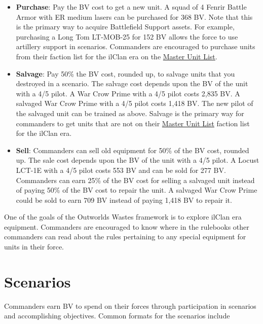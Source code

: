 \documentclass[UTF8]{article}
\begin{document}
\begin{itemize}
\item {\bf Purchase}: Pay the BV cost to get a new unit.
A squad of 4 Fenrir Battle Armor with ER medium lasers can be purchased for 368 BV.
Note that this is the primary way to acquire Battlefield Support assets.
For example, purchasing a Long Tom LT-MOB-25 for 152 BV allows the force to use artillery support in scenarios.
Commanders are encouraged to purchase units from their faction list for the ilClan era on the \href{http://www.masterunitlist.info/}{Master Unit List}.

\item {\bf Salvage}: Pay 50\% the BV cost, rounded up, to salvage units that you destroyed in a scenario.
The salvage cost depends upon the BV of the unit with a 4/5 pilot.
A War Crow Prime with a 4/5 pilot costs 2,835 BV.
A salvaged War Crow Prime with a 4/5 pilot costs 1,418 BV.
The new pilot of the salvaged unit can be trained as above.
Salvage is the primary way for commanders to get units that are not on their \href{http://www.masterunitlist.info/}{Master Unit List} faction list for the ilClan era.

\item {\bf Sell}: Commanders can sell old equipment for 50\% of the BV cost, rounded up.
The sale cost depends upon the BV of the unit with a 4/5 pilot.
A Locust LCT-1E with a 4/5 pilot costs 553 BV and can be sold for 277 BV.
Commanders can earn 25\% of the BV cost for selling a salvaged unit instead of paying 50\% of the BV cost to repair the unit.
A salvaged War Crow Prime could be sold to earn 709 BV instead of paying 1,418 BV to repair it.

\end{itemize}

One of the goals of the Outworlds Wastes framework is to explore ilClan era equipment.
Commanders are encouraged to know where in the rulebooks other commanders can read about the rules pertaining to any special equipment for units in their force.\\

\newpage

\section{Scenarios}

Commanders earn BV to spend on their forces through participation in scenarios and accomplishing objectives.
Common formats for the scenarios include
\end{document}
